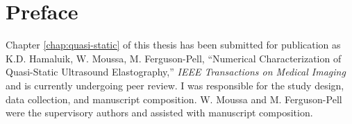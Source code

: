 \onehalfspacing
\chapter*{Preface}
	Chapter \ref{chap:quasi-static} of this thesis has been submitted for publication as K.D. Hamaluik, W. Moussa, M. Ferguson-Pell, ``Numerical Characterization of Quasi-Static Ultrasound Elastography,'' \emph{IEEE Transactions on Medical Imaging} and is currently undergoing peer review. I was responsible for the study design, data collection, and manuscript composition. W. Moussa and M. Ferguson-Pell were the supervisory authors and assisted with manuscript composition.